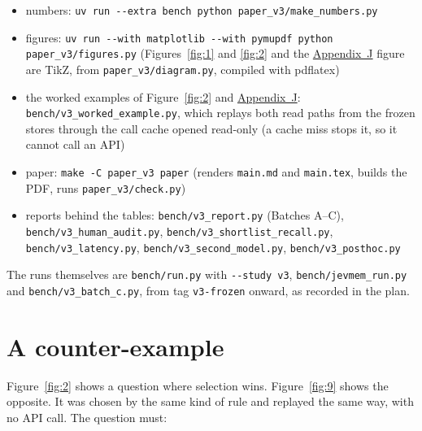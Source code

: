 \documentclass[11pt]{article}
\begin{document}
\begin{itemize}
\item numbers: \texttt{uv run -{}-extra bench python paper\_\allowbreak{}v3/\allowbreak{}make\_\allowbreak{}numbers.py}
\item figures: \texttt{uv run -{}-with matplotlib -{}-with pymupdf python paper\_\allowbreak{}v3/\allowbreak{}figures.py} (Figures~\ref{fig:1} and \ref{fig:2} and the \hyperref[app:J]{Appendix~J} figure are TikZ, from \texttt{paper\_\allowbreak{}v3/\allowbreak{}diagram.py}, compiled with pdflatex)
\item the worked examples of Figure~\ref{fig:2} and \hyperref[app:J]{Appendix~J}: \texttt{bench/\allowbreak{}v3\_\allowbreak{}worked\_\allowbreak{}example.py}, which replays both read paths from the frozen stores through the call cache opened read-only (a cache miss stops it, so it cannot call an API)
\item paper: \texttt{make -C paper\_\allowbreak{}v3 paper} (renders \texttt{main.md} and \texttt{main.tex}, builds the PDF, runs \texttt{paper\_\allowbreak{}v3/\allowbreak{}check.py})
\item reports behind the tables: \texttt{bench/\allowbreak{}v3\_\allowbreak{}report.py} (Batches A--C), \texttt{bench/\allowbreak{}v3\_\allowbreak{}human\_\allowbreak{}audit.py}, \texttt{bench/\allowbreak{}v3\_\allowbreak{}shortlist\_\allowbreak{}recall.py}, \texttt{bench/\allowbreak{}v3\_\allowbreak{}latency.py}, \texttt{bench/\allowbreak{}v3\_\allowbreak{}second\_\allowbreak{}model.py}, \texttt{bench/\allowbreak{}v3\_\allowbreak{}posthoc.py}
\end{itemize}
The runs themselves are \texttt{bench/\allowbreak{}run.py} with \texttt{-{}-study v3}, \texttt{bench/\allowbreak{}jevmem\_\allowbreak{}run.py} and \texttt{bench/\allowbreak{}v3\_\allowbreak{}batch\_\allowbreak{}c.py}, from tag \texttt{v3-frozen} onward, as recorded in the plan.

\FloatBarrier
\section{A counter-example}\label{app:J}
Figure~\ref{fig:2} shows a question where selection wins. Figure~\ref{fig:9} shows the opposite. It was chosen by the same kind of rule and replayed the same way, with no API call. The question must:
\end{document}
